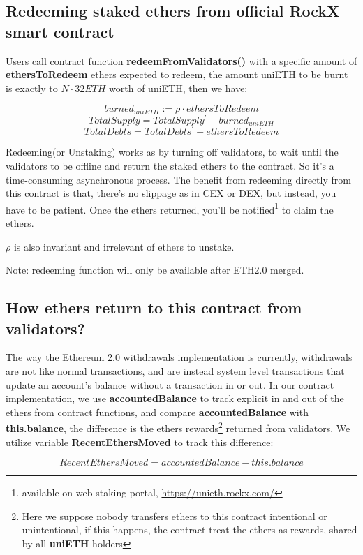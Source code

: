 \documentclass{article}
\begin{document}
\subsection{Redeeming staked ethers from official RockX smart contract}
Users call contract function \textbf{redeemFromValidators()} with a specific amount of \textbf{ethersToRedeem} ethers expected to redeem, the amount uniETH to be burnt is exactly to $N\cdot 32ETH$ worth of uniETH, then we have:
\begin{theorem}
\label{Redeem}
\[burned_{uniETH} := \rho \cdot ethersToRedeem \]
\[TotalSupply = TotalSupply^{\prime} - burned_{uniETH} \]
\[TotalDebts = TotalDebts^{\prime} + ethersToRedeem\]
\end{theorem}
Redeeming(or Unstaking) works as by turning off validators, to wait until the validators to be offline and return the staked ethers to the contract. So it's a time-consuming asynchronous process. The benefit from redeeming directly from this contract is that, there's no slippage as in CEX or DEX, but instead, you have to be patient. Once the ethers returned, you'll be notified\footnote{available on web staking portal, \url{https://unieth.rockx.com/}} to claim the ethers.

$\rho$ is also invariant and irrelevant of ethers to unstake.

Note: redeeming function will only be available after ETH2.0 merged.

\subsection{How ethers return to this contract from validators? }
\label{sectionAccounting}

The way the Ethereum 2.0 withdrawals implementation is currently, withdrawals are not like normal transactions, and are instead system level transactions that update an account's balance without a transaction in or out. In our contract implementation, we use \textbf{accountedBalance} to track explicit in and out of the ethers from contract functions, and compare \textbf{accountedBalance} with \textbf{this.balance}, the difference is the ethers rewards\footnote{Here we suppose nobody transfers ethers to this contract intentional or unintentional, if this happens, the contract treat the ethers as rewards, shared by all \textbf{uniETH} holders} returned from validators. We utilize variable \textbf{RecentEthersMoved} to track this difference:

\[RecentEthersMoved = accountedBalance - this.balance\]
\end{document}
